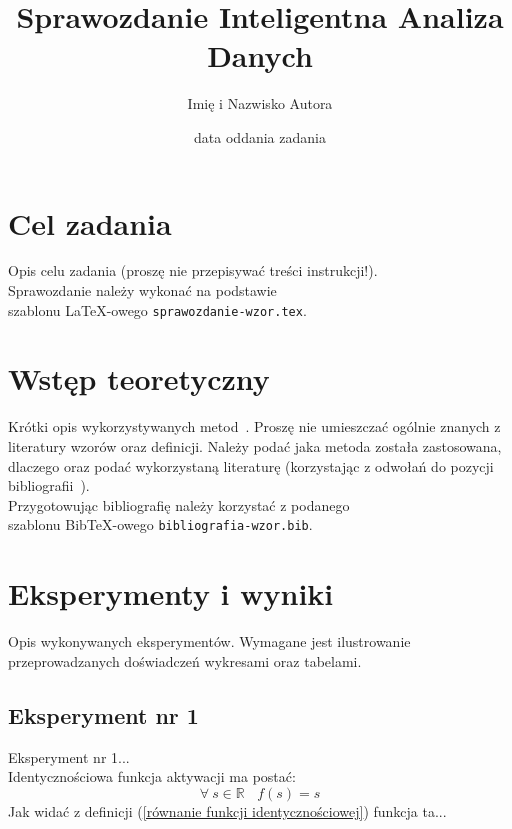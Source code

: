 \documentclass[12pt]{article}
\title{{\bf Sprawozdanie}\linebreak
Inteligentna Analiza Danych}
\author{Imię i Nazwisko Autora}
\date{data oddania zadania}
\newcommand{\BibTeX}{{\sc Bib}\TeX}
\begin{document}
\clearpage\maketitle
\thispagestyle{empty}
\newpage
\setcounter{page}{1}
\section{Cel zadania}

Opis celu zadania (proszę nie przepisywać treści instrukcji!).\\
Sprawozdanie należy wykonać na podstawie\\ 
szablonu \LaTeX-owego \texttt{sprawozdanie-wzor.tex}.

\section{Wstęp teoretyczny}

Krótki opis wykorzystywanych metod~\cite{dowolna_etykieta_artykulu}. Proszę nie umieszczać ogólnie znanych z literatury
wzorów oraz definicji. Należy podać jaka metoda została zastosowana, dlaczego oraz podać wykorzystaną literaturę (korzystając z odwołań do pozycji bibliografii~\cite{dowolna_etykieta_ksiazki}).\\
Przygotowując bibliografię należy korzystać z podanego\\ 
szablonu \BibTeX-owego \texttt{bibliografia-wzor.bib}.

\section{Eksperymenty i wyniki}

Opis wykonywanych eksperymentów. Wymagane jest ilustrowanie przeprowadzanych doświadczeń wykresami oraz tabelami.


\subsection{Eksperyment nr 1}

Eksperyment nr 1...\\
Identycznościowa funkcja aktywacji ma postać:
\begin{equation}
 \forall\: s \in \mathbb{R}\:\:\:\: f(s) = s
 \label{równanie funkcji identycznościowej}
\end{equation}
Jak widać z definicji (\ref{równanie funkcji identycznościowej}) funkcja ta...
\end{document}
